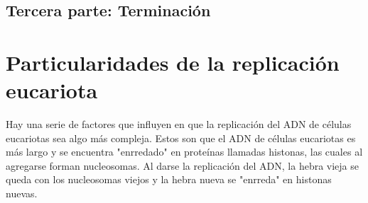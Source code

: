 \subsection{Tercera parte: Terminación}



\section{Particularidades de la replicación eucariota}

Hay una serie de factores que influyen en que la replicación del ADN de células eucariotas sea algo más compleja. Estos son que el ADN de células eucariotas es más largo y se encuentra "enrredado" en proteínas llamadas histonas, las cuales al agregarse forman nucleosomas. Al darse la replicación del ADN, la hebra vieja se queda con los nucleosomas viejos y la hebra nueva se "enrreda" en histonas nuevas.